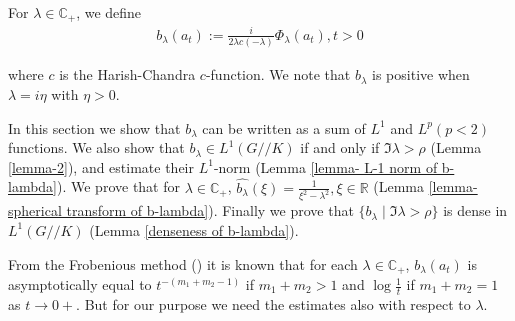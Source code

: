 \documentclass[11pt,reqno]{amsart}
\newcommand{\what}{\widehat}%
\newcommand{\R}{\mathbb R}%
\newcommand{\C}{\mathbb C}%
\theoremstyle{definition}
\theoremstyle{definition}
\numberwithin{equation}{section}
\begin{document}
For $\lambda\in \mathbb{C}_+$, we define 
\begin{eqnarray}\label{definition of b-lambda}
b_\lambda(a_t):=\frac{i}{2\lambda c(-\lambda)}\Phi_\lambda(a_t), t>0
\end{eqnarray}

where $c$ is the Harish-Chandra $c$-function. We note that $b_\lambda$  is positive when $\lambda=i\eta$ with $\eta>0$. 

\vspace{.5cm}
In this section we show that $b_\lambda$ can be written as a sum of $L^1$ and $L^p (p<2)$ functions. We also show that $b_\lambda\in L^1(G//K)$ if and only if $\Im\lambda>\rho$ (Lemma \ref{lemma-2}), and  estimate their $L^1$-norm (Lemma \ref{lemma- L-1 norm of b-lambda}). We prove that for $\lambda\in\C_+$, $\what{b_\lambda}(\xi)=\frac{1}{\xi^2-\lambda^2}, \xi\in\R$ (Lemma \ref{lemma-spherical transform of b-lambda}).  Finally we prove that $\{b_\lambda\mid\Im\lambda>\rho\}$ is dense in $L^1(G//K)$ (Lemma \ref{denseness of b-lambda}).

\vspace{.5cm}

From the Frobenious method (\cite[Chapter 4, \S 8]{Coddington}) it is known that for each $\lambda\in\C_+$, $b_\lambda(a_t)$ is asymptotically equal to $t^{-(m_1+m_2-1)}$ if $m_1+m_2>1$ and $\log \frac{1}{t}$ if $m_1+m_2=1$ as $t\rightarrow 0+$. But for our purpose we need the estimates also with respect to $\lambda$.
\end{document}
